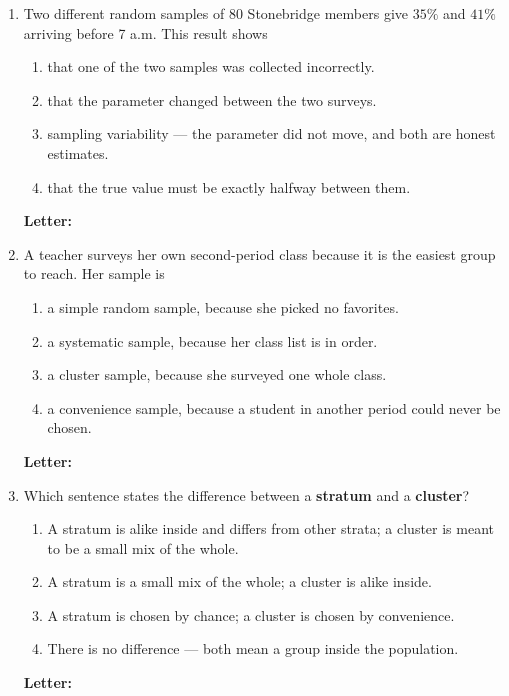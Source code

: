 \documentclass[10pt]{article}
\begin{document}
\begin{enumerate}[leftmargin=2.2em, itemsep=5pt, topsep=2pt, start=9]
\item Two different random samples of $80$ Stonebridge members give $35\%$ and $41\%$ arriving
before 7 a.m. This result shows
\begin{enumerate}[label=(\Alph*), leftmargin=1.8em, itemsep=1pt, topsep=1pt]
  \item that one of the two samples was collected incorrectly.
  \item that the parameter changed between the two surveys.
  \item sampling variability --- the parameter did not move, and both are honest estimates.
  \item that the true value must be exactly halfway between them.
\end{enumerate}
\hfill \textbf{Letter:} \gradedblank[id=q12, type=choice, points=2, answer={C}]{0.9cm}{11pt}

\item A teacher surveys her own second-period class because it is the easiest group to reach.
Her sample is
\begin{enumerate}[label=(\Alph*), leftmargin=1.8em, itemsep=1pt, topsep=1pt]
  \item a simple random sample, because she picked no favorites.
  \item a systematic sample, because her class list is in order.
  \item a cluster sample, because she surveyed one whole class.
  \item a convenience sample, because a student in another period could never be chosen.
\end{enumerate}
\hfill \textbf{Letter:} \gradedblank[id=q13, type=choice, points=2, answer={D}]{0.9cm}{11pt}

\item Which sentence states the difference between a \textbf{stratum} and a \textbf{cluster}?
\begin{enumerate}[label=(\Alph*), leftmargin=1.8em, itemsep=1pt, topsep=1pt]
  \item A stratum is alike inside and differs from other strata; a cluster is meant to be a
        small mix of the whole.
  \item A stratum is a small mix of the whole; a cluster is alike inside.
  \item A stratum is chosen by chance; a cluster is chosen by convenience.
  \item There is no difference --- both mean a group inside the population.
\end{enumerate}
\hfill \textbf{Letter:} \gradedblank[id=q14, type=choice, points=2, answer={A}]{0.9cm}{11pt}

\end{enumerate}
\normalsize
\end{document}
